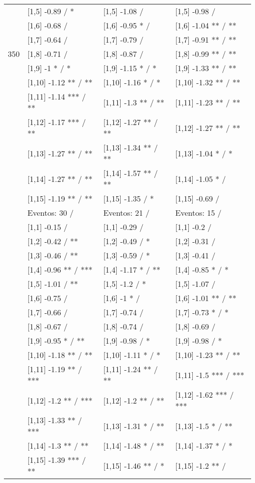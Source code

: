 \begin{table}
\begin{tabular}[t]{llll}
 & {}[1,5] -0.89  / * & {}[1,5] -1.08  / & {}[1,5] -0.98  /\\
 & {}[1,6] -0.68  / & {}[1,6] -0.95 * / & {}[1,6] -1.04 ** / **\\
 & {}[1,7] -0.64  / & {}[1,7] -0.79  / & {}[1,7] -0.91 ** / **\\
350 & {}[1,8] -0.71  / & {}[1,8] -0.87  / & {}[1,8] -0.99 ** / **\\
\addlinespace
 & {}[1,9] -1 * / * & {}[1,9] -1.15 * / * & {}[1,9] -1.33 ** / **\\
 & {}[1,10] -1.12 ** / ** & {}[1,10] -1.16 * / * & {}[1,10] -1.32 ** / **\\
 & {}[1,11] -1.14 *** / ** & {}[1,11] -1.3 ** / ** & {}[1,11] -1.23 ** / **\\
 & {}[1,12] -1.17 *** / ** & {}[1,12] -1.27 ** / ** & {}[1,12] -1.27 ** / **\\
 & {}[1,13] -1.27 ** / ** & {}[1,13] -1.34 ** / ** & {}[1,13] -1.04 * / *\\
\addlinespace
 & {}[1,14] -1.27 ** / ** & {}[1,14] -1.57 ** / ** & {}[1,14] -1.05 * /\\
 & {}[1,15] -1.19 ** / ** & {}[1,15] -1.35  / * & {}[1,15] -0.69  /\\
 & Eventos:  30 / & Eventos:  21 / & Eventos:  15 /\\
 & {}[1,1] -0.15  / & {}[1,1] -0.29  / & {}[1,1] -0.2  /\\
 & {}[1,2] -0.42  / ** & {}[1,2] -0.49  / * & {}[1,2] -0.31  /\\
\addlinespace
 & {}[1,3] -0.46  / ** & {}[1,3] -0.59  / * & {}[1,3] -0.41  /\\
 & {}[1,4] -0.96 ** / *** & {}[1,4] -1.17 * / ** & {}[1,4] -0.85 * / *\\
 & {}[1,5] -1.01  / ** & {}[1,5] -1.2  / * & {}[1,5] -1.07  /\\
 & {}[1,6] -0.75  / & {}[1,6] -1 * / & {}[1,6] -1.01 ** / **\\
 & {}[1,7] -0.66  / & {}[1,7] -0.74  / & {}[1,7] -0.73 * / *\\
\addlinespace
500 & {}[1,8] -0.67  / & {}[1,8] -0.74  / & {}[1,8] -0.69  /\\
 & {}[1,9] -0.95 * / ** & {}[1,9] -0.98  / * & {}[1,9] -0.98  / *\\
 & {}[1,10] -1.18 ** / ** & {}[1,10] -1.11 * / * & {}[1,10] -1.23 ** / **\\
 & {}[1,11] -1.19 ** / *** & {}[1,11] -1.24 ** / ** & {}[1,11] -1.5 *** / ***\\
 & {}[1,12] -1.2 ** / *** & {}[1,12] -1.2 ** / ** & {}[1,12] -1.62 *** / ***\\
\addlinespace
 & {}[1,13] -1.33 ** / *** & {}[1,13] -1.31 * / ** & {}[1,13] -1.5 * / **\\
 & {}[1,14] -1.3 ** / ** & {}[1,14] -1.48 * / ** & {}[1,14] -1.37 * / *\\
 & {}[1,15] -1.39 *** / ** & {}[1,15] -1.46 ** / * & {}[1,15] -1.2 ** /\\
\bottomrule
\end{tabular}
\end{table}
